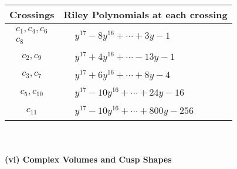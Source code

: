\documentclass[1p]{elsarticle_modified}
\theoremstyle{definition}
\begin{document}
\begin{tabular}{m{50pt}|m{274pt}}
Crossings & \hspace{64pt}Riley Polynomials at each crossing \\
\hline $$\begin{aligned}c_{1},c_{4},c_{6}\\c_{8}\end{aligned}$$&$\begin{aligned}
&y^{17}-8 y^{16}+\cdots+3 y-1
\end{aligned}$\\
\hline $$\begin{aligned}c_{2},c_{9}\end{aligned}$$&$\begin{aligned}
&y^{17}+4 y^{16}+\cdots-13 y-1
\end{aligned}$\\
\hline $$\begin{aligned}c_{3},c_{7}\end{aligned}$$&$\begin{aligned}
&y^{17}+6 y^{16}+\cdots+8 y-4
\end{aligned}$\\
\hline $$\begin{aligned}c_{5},c_{10}\end{aligned}$$&$\begin{aligned}
&y^{17}-10 y^{16}+\cdots+24 y-16
\end{aligned}$\\
\hline $$\begin{aligned}c_{11}\end{aligned}$$&$\begin{aligned}
&y^{17}-10 y^{16}+\cdots+800 y-256
\end{aligned}$\\
\hline
\end{tabular}\\~\\
\newpage\flushleft \textbf{(vi) Complex Volumes and Cusp Shapes}
\end{document}
